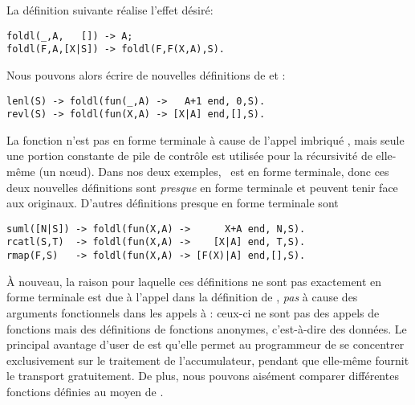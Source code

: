 La définition suivante réalise l'effet désiré:
\begin{verbatim}
foldl(_,A,   []) -> A;
foldl(F,A,[X|S]) -> foldl(F,F(X,A),S).
\end{verbatim}
Nous pouvons alors écrire de nouvelles définitions de 
et :
\begin{verbatim}
lenl(S) -> foldl(fun(_,A) ->   A+1 end, 0,S).
revl(S) -> foldl(fun(X,A) -> [X|A] end,[],S).
\end{verbatim}
La fonction  n'est pas en forme terminale à cause de
l'appel imbriqué , mais seule une portion constante de
pile de contrôle est utilisée pour la récursivité de 
elle-même (un nœud). Dans nos deux exemples, ~est en
forme terminale, donc ces deux nouvelles définitions sont
\emph{presque} en forme terminale et peuvent tenir face aux
originaux. D'autres définitions presque en forme terminale sont
\begin{verbatim}
suml([N|S]) -> foldl(fun(X,A) ->      X+A end, N,S).
rcatl(S,T)  -> foldl(fun(X,A) ->    [X|A] end, T,S).
rmap(F,S)   -> foldl(fun(X,A) -> [F(X)|A] end,[],S).
\end{verbatim}
À nouveau, la raison pour laquelle ces définitions ne sont pas
exactement en forme terminale est due à l'appel  dans
la définition de , \emph{pas} à cause des arguments
fonctionnels  dans les appels à
: ceux-ci ne sont pas des appels de fonctions mais
des définitions de fonctions anonymes, c'est-à-dire des données. Le
principal avantage d'user de  est qu'elle permet au
programmeur de se concentrer exclusivement sur le traitement de
l'accumulateur, pendant que  elle-même fournit le
transport gratuitement. De plus, nous pouvons aisément comparer
différentes fonctions définies au moyen de .

